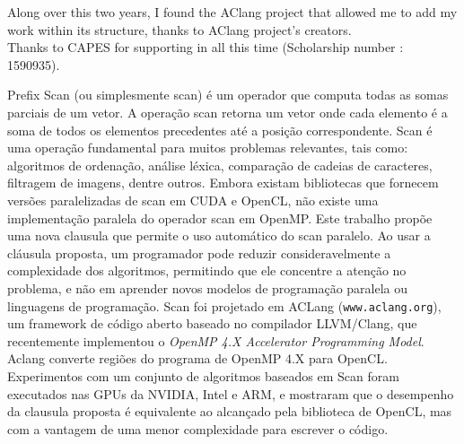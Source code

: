 \documentclass[Ingles]{ic-tese-v1}
\newcommand{\tit}[1]{{\textit{#1}}}
\begin{document}
Along over this two years, I found the AClang project that allowed me to add my work within its structure, thanks to AClang project's creators.\\
Thanks to CAPES for supporting in all this time (Scholarship number : 1590935). 


\begin{resumo}
Prefix Scan (ou simplesmente scan) é um operador que computa todas as somas
parciais de um vetor. A operação scan retorna um vetor onde cada elemento é a
soma de todos os elementos precedentes até a posição correspondente. Scan é uma
operação fundamental para muitos problemas relevantes, tais como: algoritmos de
ordenação, análise léxica, comparação de cadeias de caracteres, filtragem de
imagens, dentre outros. Embora existam bibliotecas que fornecem versões
paralelizadas de scan em CUDA e OpenCL, não existe uma implementação paralela
do operador scan em OpenMP. Este trabalho propõe uma nova clausula que permite
o uso automático do scan paralelo. Ao usar a cláusula proposta, um programador
pode reduzir consideravelmente a complexidade dos algoritmos, permitindo que
ele concentre a atenção no problema, e não em aprender novos modelos de
programação paralela ou linguagens de programação. Scan foi projetado em ACLang
(\texttt{www.aclang.org}), um framework de código aberto baseado no compilador
LLVM/Clang, que recentemente implementou o \tit{OpenMP 4.X Accelerator Programming
Model}. Aclang converte regiões do programa de OpenMP 4.X para OpenCL.
Experimentos com um conjunto de algoritmos baseados em Scan foram executados
nas GPUs da NVIDIA, Intel e ARM, e mostraram que o desempenho da 
clausula proposta  é equivalente ao alcançado pela biblioteca de OpenCL, mas com a
vantagem de uma menor complexidade para escrever o código.
\end{resumo}
\end{document}
